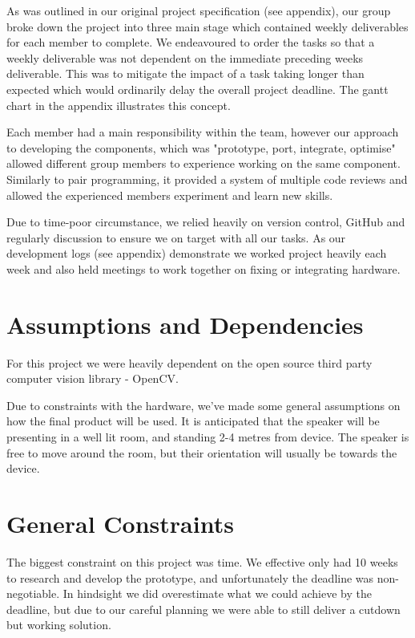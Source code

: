 \documentclass[11pt,a4paper,titlepage]{report}
\begin{document}
As was outlined in our original project specification (see appendix), our group broke down the project into three main stage which contained weekly deliverables for each member to complete. We endeavoured to order the tasks so that a weekly deliverable was not dependent on the immediate preceding weeks deliverable. This was to mitigate the impact of a task taking longer than expected which would ordinarily delay the overall project deadline. The gantt chart in the appendix illustrates this concept.

Each member had a main responsibility within the team, however our approach to developing the components, which was "prototype, port, integrate, optimise" allowed different group members to experience working on the same component. Similarly to pair programming, it provided a system of multiple code reviews and allowed the experienced members experiment and learn new skills.

Due to time-poor circumstance, we relied heavily on version control, GitHub and regularly discussion to ensure we on target with all our tasks. As our development logs (see appendix) demonstrate we worked project heavily each week and also held meetings to work together on fixing or integrating hardware.




\section{Assumptions and Dependencies}

For this project we were heavily dependent on the open source third party computer vision library - OpenCV.

Due to constraints with the hardware, we've made some general assumptions on how the final product will be used. It is anticipated that the speaker will be presenting in a well lit room, and standing 2-4 metres from device. The speaker is free to move around the room, but their orientation will usually be towards the device.

\section{General Constraints}

The biggest constraint on this project was time. We effective only had 10 weeks to research and develop the prototype, and unfortunately the deadline was non-negotiable. In hindsight we did overestimate what we could achieve by the deadline, but due to our careful planning we were able to still deliver a cutdown but working solution.
\end{document}
